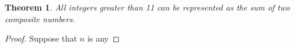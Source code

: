 \documentclass{article}
\newtheorem{theorem}{Theorem}
\begin{document}
\begin{theorem}
All integers greater than 11 can be represented as the sum of two composite numbers.
\end{theorem}

\begin{proof}
Suppose that $n$ is any
\end{proof}
\end{document}
